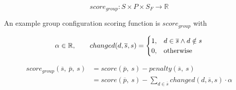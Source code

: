 \documentclass{article}
\begin{document}
\begin{equation}
    score_{group}: S \times P \times S_F \to \mathbb{R}
\end{equation}

An example group configuration scoring function is $score_{group}$ with

\begin{equation}
    \notag \alpha \in \mathbb{R}, \qquad     changed(d,\overline{s}, s) = 
    \begin{cases}
      1, & d \in \overline{s} \land d \notin s \\
      0, & \text{otherwise}
    \end{cases}
\end{equation}

\begin{equation}
    \begin{split}
        score_{group}(\overline{s},\ \overline{p},\ s)
        & = score(\overline{p},\ s) - penalty(\overline{s},\ s) \\
        & = score(\overline{p},\ s) - \sum_{d \in \overline{s}} changed(d,\overline{s}, s) \cdot \alpha
    \end{split}
\end{equation}
\end{document}
